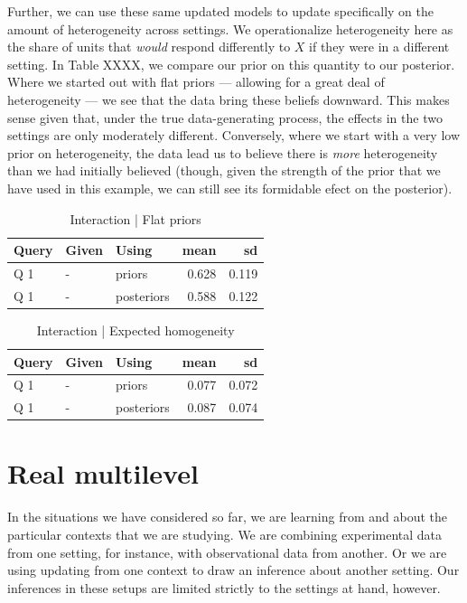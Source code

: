 \documentclass[
  12pt,
]{book}
\begin{document}
Further, we can use these same updated models to update specifically on the amount of heterogeneity across settings. We operationalize heterogeneity here as the share of units that \emph{would} respond differently to \(X\) if they were in a different setting. In Table XXXX, we compare our prior on this quantity to our posterior. Where we started out with flat priors --- allowing for a great deal of heterogeneity --- we see that the data bring these beliefs downward. This makes sense given that, under the true data-generating process, the effects in the two settings are only moderately different. Conversely, where we start with a very low prior on heterogeneity, the data lead us to believe there is \emph{more} heterogeneity than we had initially believed (though, given the strength of the prior that we have used in this example, we can still see its formidable efect on the posterior).

\begin{table}

\caption{\label{tab:unnamed-chunk-12}Interaction | Flat priors}
\centering
\begin{tabular}[t]{l|l|l|r|r}
\hline
Query & Given & Using & mean & sd\\
\hline
Q 1 & - & priors & 0.628 & 0.119\\
\hline
Q 1 & - & posteriors & 0.588 & 0.122\\
\hline
\end{tabular}
\end{table}

\begin{table}

\caption{\label{tab:unnamed-chunk-12}Interaction | Expected homogeneity}
\centering
\begin{tabular}[t]{l|l|l|r|r}
\hline
Query & Given & Using & mean & sd\\
\hline
Q 1 & - & priors & 0.077 & 0.072\\
\hline
Q 1 & - & posteriors & 0.087 & 0.074\\
\hline
\end{tabular}
\end{table}

\hypertarget{real-multilevel}{%
\section{Real multilevel}\label{real-multilevel}}

In the situations we have considered so far, we are learning from and about the particular contexts that we are studying. We are combining experimental data from one setting, for instance, with observational data from another. Or we are using updating from one context to draw an inference about another setting. Our inferences in these setups are limited strictly to the settings at hand, however.
\end{document}

